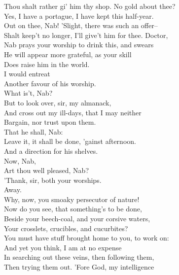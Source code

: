 \documentclass{memoir}
\begin{document}
\begin{drama*}
 Thou shalt rather gi' him thy shop. No gold about thee?\\
\druggerspeaks  Yes, I have a portague, I have kept this half-year.\\
\facespeaks  Out on thee, Nab! 'Slight, there was such an offer--\\
 Shalt keep't no longer, I'll give't him for thee. Doctor,\\
 Nab prays your worship to drink this, and swears\\
 He will appear more grateful, as your skill\\
 Does raise him in the world.\\
\druggerspeaks {} I would entreat\\
 Another favour of his worship.\\
\facespeaks  What is't, Nab?\\
\druggerspeaks {} But to look over, sir, my almanack,\\
 And cross out my ill-days, that I may neither\\
 Bargain, nor trust upon them.\\
\facespeaks {} That he shall, Nab:\\
 Leave it, it shall be done, 'gainst afternoon.\\
\subtlespeaks  And a direction for his shelves.\\
\facespeaks {} Now, Nab,\\
 Art thou well pleased, Nab?\\
\druggerspeaks {} 'Thank, sir, both your worships.\\
\facespeaks  Away.\\
 Why, now, you smoaky persecutor of nature!\\
 Now do you see, that something's to be done,\\
 Beside your beech-coal, and your corsive waters,\\
 Your crosslets, crucibles, and cucurbites?\\
 You must have stuff brought home to you, to work on:\\
 And yet you think, I am at no expense\\
 In searching out these veins, then following them,\\
 Then trying them out. 'Fore God, my intelligence\\

\end{drama*}
\end{document}
